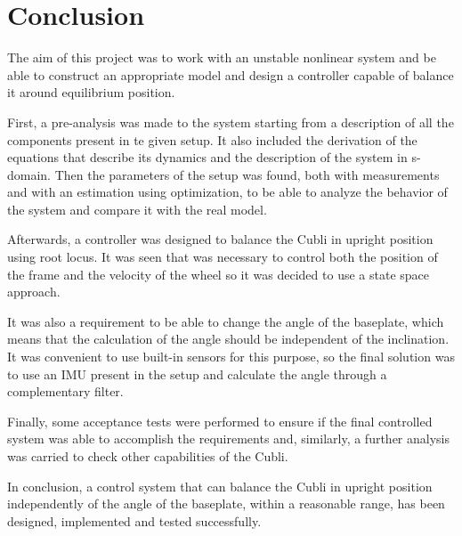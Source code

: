 \chapter{Conclusion}

The aim of this project was to work with an unstable nonlinear system and be able to construct an appropriate model and design a controller capable of balance it around equilibrium position.

First, a pre-analysis was made to the system starting from a description of all the components present in te given setup. It also included the derivation of the equations that describe its dynamics and the description of the system in s-domain. Then the parameters of the setup was found, both with measurements and with an estimation using optimization, to be able to analyze the behavior of the system and compare it with the real model.

Afterwards, a controller was designed to balance the Cubli in upright position using root locus. It was seen that was necessary to control both the position of the frame and the velocity of the wheel so it was decided to use a state space approach.

It was also a requirement to be able to change the angle of the baseplate, which means that the calculation of the angle should be independent of the inclination. It was convenient to use built-in sensors for this purpose, so the final solution was to use an IMU present in the setup and calculate the angle through a complementary filter.

Finally, some acceptance tests were performed to ensure if the final controlled system was able to accomplish the requirements and, similarly, a further analysis was carried to check other capabilities of the Cubli.

In conclusion, a control system that can balance the Cubli in upright position independently of the angle of the baseplate, within a reasonable range, has been designed, implemented and tested successfully.
